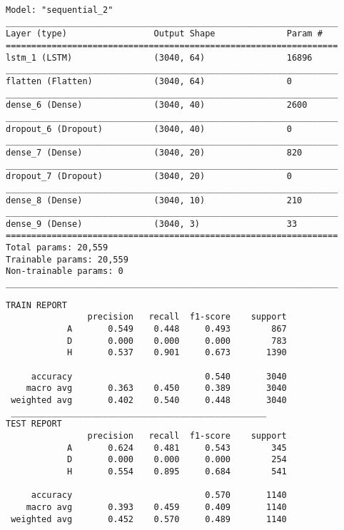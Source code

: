 \begin{lstlisting}[style=arch]
Model: "sequential_2"
_________________________________________________________________
Layer (type)                 Output Shape              Param #   
=================================================================
lstm_1 (LSTM)                (3040, 64)                16896     
_________________________________________________________________
flatten (Flatten)            (3040, 64)                0         
_________________________________________________________________
dense_6 (Dense)              (3040, 40)                2600      
_________________________________________________________________
dropout_6 (Dropout)          (3040, 40)                0         
_________________________________________________________________
dense_7 (Dense)              (3040, 20)                820       
_________________________________________________________________
dropout_7 (Dropout)          (3040, 20)                0         
_________________________________________________________________
dense_8 (Dense)              (3040, 10)                210       
_________________________________________________________________
dense_9 (Dense)              (3040, 3)                 33        
=================================================================
Total params: 20,559
Trainable params: 20,559
Non-trainable params: 0
_________________________________________________________________

\end{lstlisting}

\begin{lstlisting}[style=report]
TRAIN REPORT
                precision   recall  f1-score    support
            A       0.549    0.448     0.493        867
            D       0.000    0.000     0.000        783
            H       0.537    0.901     0.673       1390

     accuracy                          0.540       3040
    macro avg       0.363    0.450     0.389       3040
 weighted avg       0.402    0.540     0.448       3040
 __________________________________________________
TEST REPORT
                precision   recall  f1-score    support
            A       0.624    0.481     0.543        345
            D       0.000    0.000     0.000        254
            H       0.554    0.895     0.684        541

     accuracy                          0.570       1140
    macro avg       0.393    0.459     0.409       1140
 weighted avg       0.452    0.570     0.489       1140
\end{lstlisting}


